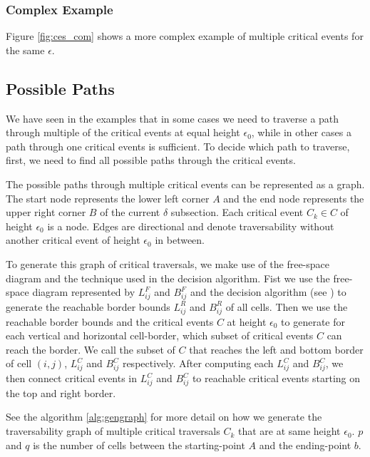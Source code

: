 \subsubsection{Complex Example}

Figure \ref{fig:ces_com} shows a more complex example of multiple critical events for the same $\epsilon$. 






\subsection{Possible Paths} \label{sec:gengraph}

We have seen in the examples that in some cases we need to traverse a path through multiple of the critical events at equal height $\epsilon_0$, while in other cases a path through one critical events is sufficient. To decide which path to traverse, first, we need to find all possible paths through the critical events.

The possible paths through multiple critical events can be represented as a graph. The start node represents the lower left corner $A$ and the end node represents the upper right corner $B$ of the current $\delta$ subsection. Each critical event $C_k \in C$ of height $\epsilon_0$ is a node. Edges are directional and denote traversability without another critical event of height $\epsilon_0$ in between.

To generate this graph of critical traversals, we make use of the free-space diagram and the technique used in the decision algorithm. Fist we use the free-space diagram represented by $L_{ij}^F$ and $B_{ij}^F$ and the decision algorithm (see \citet{altgodau}) to generate the reachable border bounds $L_{ij}^R$ and $B_{ij}^R$ of all cells. Then we use the reachable border bounds and the critical events $C$ at height $\epsilon_0$ to generate for each vertical and horizontal cell-border, which subset of critical events $C$ can reach the border. We call the subset of $C$ that reaches the left and bottom border of cell $(i,j)$, $L_{ij}^C$ and $B_{ij}^C$ respectively. After computing each $L_{ij}^C$ and $B_{ij}^C$, we then connect critical events in $L_{ij}^C$ and $B_{ij}^C$ to reachable critical events starting on the top and right border.

See the algorithm \ref{alg:gengraph} for more detail on how we generate the traversability graph of multiple critical traversals $C_k$ that are at same height $\epsilon_0$. $p$ and $q$ is the number of cells between the starting-point $A$ and the ending-point $b$.


